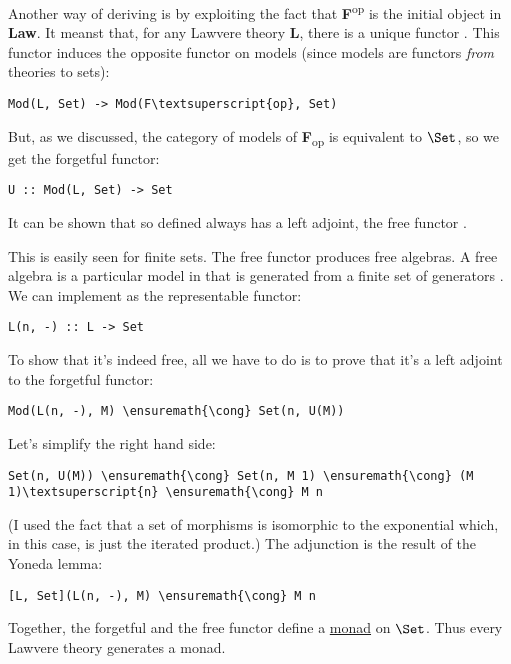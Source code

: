 Another way of deriving  is by exploiting the fact that
\textbf{F}\textsuperscript{op} is the initial object in \textbf{Law}. It
meanst that, for any Lawvere theory \textbf{L}, there is a unique
functor . This functor induces the
opposite functor on models (since models are functors \emph{from}
theories to sets):

\begin{Verbatim}[commandchars=\\\{\}]
Mod(L, Set) -> Mod(F\textsuperscript{op}, Set)
\end{Verbatim}
But, as we discussed, the category of models of
\textbf{F}\textsubscript{op} is equivalent to $\Set$, so we get
the forgetful functor:

\begin{Verbatim}[commandchars=\\\{\}]
U :: Mod(L, Set) -> Set
\end{Verbatim}
It can be shown that so defined  always has a left adjoint,
the free functor .

This is easily seen for finite sets. The free functor 
produces free algebras. A free algebra is a particular model in
 that is generated from a finite set of generators
. We can implement  as the representable functor:

\begin{Verbatim}[commandchars=\\\{\}]
L(n, -) :: L -> Set
\end{Verbatim}
To show that it's indeed free, all we have to do is to prove that it's a
left adjoint to the forgetful functor:

\begin{Verbatim}[commandchars=\\\{\}]
Mod(L(n, -), M) \ensuremath{\cong} Set(n, U(M))
\end{Verbatim}
Let's simplify the right hand side:

\begin{Verbatim}[commandchars=\\\{\}]
Set(n, U(M)) \ensuremath{\cong} Set(n, M 1) \ensuremath{\cong} (M 1)\textsuperscript{n} \ensuremath{\cong} M n
\end{Verbatim}
(I used the fact that a set of morphisms is isomorphic to the
exponential which, in this case, is just the iterated product.) The
adjunction is the result of the Yoneda lemma:

\begin{Verbatim}[commandchars=\\\{\}]
[L, Set](L(n, -), M) \ensuremath{\cong} M n
\end{Verbatim}
Together, the forgetful and the free functor define a
\hyperref[monads-categorically]{monad}
 on $\Set$. Thus every Lawvere theory generates
a monad.

